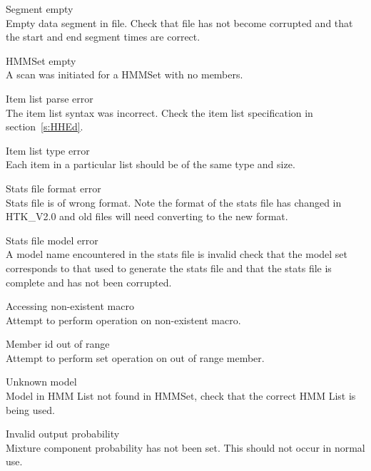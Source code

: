 \begin{itemize}
\begin{itemize}
    Segment empty\\
        Empty data segment in file. Check that file has not
        become corrupted and that the start and end segment times
        are correct.

\end{itemize}


\begin{itemize}
    HMMSet empty\\
        A scan was initiated for a HMMSet with no members.

    Item list parse error\\
        The item list syntax was incorrect.  Check the item list specification
        in section~\ref{s:HHEd}.

    Item list type error\\
        Each item in a particular list should be of the same type and size.

    Stats file format error\\
        Stats file is of wrong format.  Note the format of the stats file has 
        changed in HTK\_V2.0 and old files will need converting to the new
        format.

    Stats file model error\\
        A model name encountered in the stats file is invalid check that the
        model set corresponds to that used to generate the stats file and that
        the stats file is complete and has not been corrupted.

    Accessing non-existent macro\\
        Attempt to perform operation on non-existent macro.

    Member id out of range\\
        Attempt to perform set operation on out of range member.

\end{itemize}


\begin{itemize}

    Unknown model\\
        Model in HMM List not found in HMMSet, check that the
        correct HMM List is being used.

    Invalid output probability\\
        Mixture component probability has not been set.  This should
        not occur in normal use.


\end{itemize}
\end{itemize}
